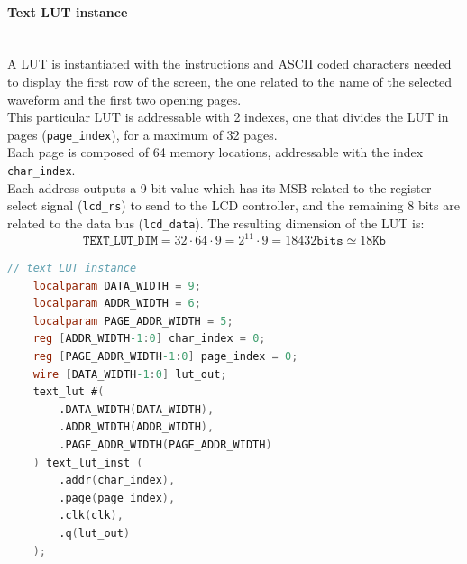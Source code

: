 \newpage

\paragraph{Text LUT instance} \quad \\
A LUT is instantiated with the instructions and ASCII coded characters needed to display the first row of the screen, the one related to the name of the selected waveform and the first two opening pages. \\
This particular LUT is addressable with 2 indexes, one that divides the LUT in pages (\texttt{page\_index}), for a maximum of 32 pages. \\
Each page is composed of 64 memory locations, addressable with the index \texttt{char\_index}. \\
Each address outputs a 9 bit value which has its MSB related to the register select signal (\texttt{lcd\_rs}) to send to the LCD controller, and the remaining 8 bits are related to the data bus (\texttt{lcd\_data}). The resulting dimension of the LUT is:     
\[
    \texttt{TEXT\_LUT\_DIM} = 32\cdot 64\cdot 9 = 2^{11}\cdot 9 = 18432 \texttt{bits} \simeq 18 \texttt{Kb}
\]

\vspace{1cm}
\begin{lstlisting}[language=Verilog, caption=LUT instance ]
    // text LUT instance
    localparam DATA_WIDTH = 9;
    localparam ADDR_WIDTH = 6;
    localparam PAGE_ADDR_WIDTH = 5;
    reg [ADDR_WIDTH-1:0] char_index = 0;
    reg [PAGE_ADDR_WIDTH-1:0] page_index = 0;
    wire [DATA_WIDTH-1:0] lut_out;  
    text_lut #(
        .DATA_WIDTH(DATA_WIDTH),
        .ADDR_WIDTH(ADDR_WIDTH),
        .PAGE_ADDR_WIDTH(PAGE_ADDR_WIDTH)
    ) text_lut_inst (
        .addr(char_index),
        .page(page_index),
        .clk(clk),
        .q(lut_out) 
    );
\end{lstlisting}
\vspace{1cm}

\newpage

